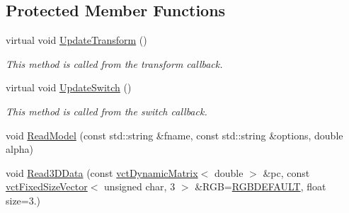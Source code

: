 \subsection*{Protected Member Functions}
\begin{DoxyCompactItemize}
\item 
virtual void \hyperlink{classosa_o_s_g_body_a0a6393b83c9dfb70997747df6a24aa0d}{Update\-Transform} ()
\begin{DoxyCompactList}\small\item\em This method is called from the transform callback. \end{DoxyCompactList}\item 
virtual void \hyperlink{classosa_o_s_g_body_aa1a1fa50eb0ee7f81b98fb235b3a33a1}{Update\-Switch} ()
\begin{DoxyCompactList}\small\item\em This method is called from the switch callback. \end{DoxyCompactList}\item 
void \hyperlink{classosa_o_s_g_body_a0c91a646007c34bd58abc87ee73634c1}{Read\-Model} (const std\-::string \&fname, const std\-::string \&options, double alpha)
\item 
void \hyperlink{classosa_o_s_g_body_adae2c975d0e59a663d3345a33d34dc09}{Read3\-D\-Data} (const \hyperlink{classvct_dynamic_matrix}{vct\-Dynamic\-Matrix}$<$ double $>$ \&pc, const \hyperlink{classvct_fixed_size_vector}{vct\-Fixed\-Size\-Vector}$<$ unsigned char, 3 $>$ \&R\-G\-B=\hyperlink{classosa_o_s_g_body_a1fb439b90b8d0277e28240e35de006dd}{R\-G\-B\-D\-E\-F\-A\-U\-L\-T}, float size=3.)
\end{DoxyCompactItemize}
